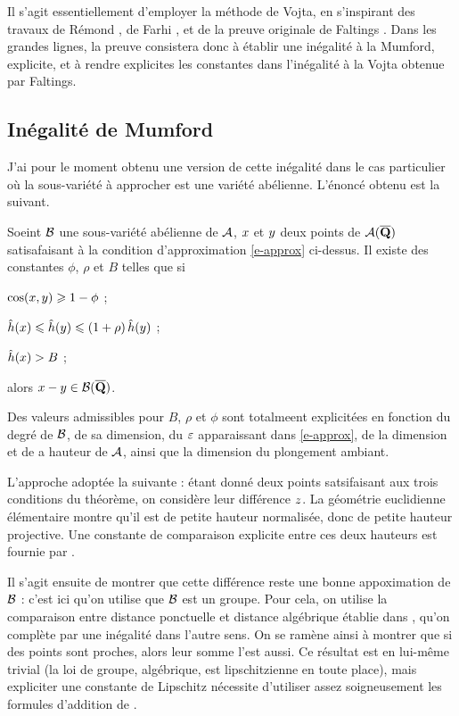 \documentclass[a4paper, 11pt]{article}
\renewcommand*\bsc{}
\begin{document}
Il s'agit essentiellement d'employer la méthode de \bsc{Vojta}, en s'inspirant
des travaux de \bsc{Rémond} \cites{remivds}{remivg}{remdcl}, de \bsc{Farhi}
\cite{farhith},
et de la preuve originale de \bsc{Faltings} \cite{falda}. Dans les grandes lignes, la
preuve consistera donc à établir une inégalité à la \bsc{Mumford}, explicite,
et à rendre explicites les constantes dans l'inégalité à la \bsc{Vojta}
obtenue par \bsc{Faltings}.

\subsection{Inégalité de \bsc{Mumford}}

J'ai pour le moment obtenu une version de cette inégalité dans le cas
particulier où la sous-variété à approcher est une variété abélienne.
L'énoncé obtenu est la suivant.

\begin{thm}
  Soeint $\mathcal B$ une sous-variété abélienne de $\mathcal A$, $x$ et $y$
  deux points de $\mathcal A(\overline{\mathbf{Q}})$ satisafaisant à la condition d'approximation
  \eqref{e-approx} ci-dessus. Il existe des constantes $\phi$, $\rho$ et $B$ telles
  que si
  \begin{enumthm}
    \item $\cos(x, y) \geqslant 1 - \phi$ ;
    \item $\mathop{\smash{\hat h}}(x) \leqslant \mathop{\smash{\hat h}}(y) \leqslant (1+\rho) \mathop{\smash{\hat h}}(y)$ ;
    \item $\mathop{\smash{\hat h}}(x) > B$ ;
  \end{enumthm}
  alors $x - y \in \mathcal B(\overline{\mathbf{Q}})$.
\end{thm}

Des valeurs admissibles pour $B$, $\rho$ et $\phi$ sont totalmeent explicitées
en fonction du degré de $\mathcal B$, de sa dimension, du $\varepsilon$ apparaissant dans
\eqref{e-approx}, de la dimension et de a hauteur de $\mathcal A$, ainsi que la dimension
du plongement ambiant.

L'approche adoptée la suivante : étant donné deux points satsifaisant aux
trois conditions du théorème, on considère leur différence $z$. La
géométrie euclidienne élémentaire montre qu'il est de petite hauteur
normalisée, donc de petite hauteur projective. Une constante de comparaison
explicite entre ces deux hauteurs est fournie par \cite{daphiminvaii}.

Il s'agit ensuite de montrer que cette différence reste une bonne appoximation
de $\mathcal B$ : c'est ici qu'on utilise que $\mathcal B$ est un groupe. Pour cela, on
utilise la comparaison entre distance ponctuelle et distance algébrique établie
dans \cite[p. 103]{pphdg}, qu'on complète par une inégalité dans l'autre sens.
On se ramène ainsi à montrer que si des points sont proches, alors leur somme
l'est aussi. Ce résultat est en lui-même trivial (la loi de groupe, algébrique,
est lipschitzienne en toute place), mais expliciter une constante de
\bsc{Lipschitz} nécessite d'utiliser assez soigneusement les formules d'addition
de \cite{daphiminvaii}.
\end{document}
